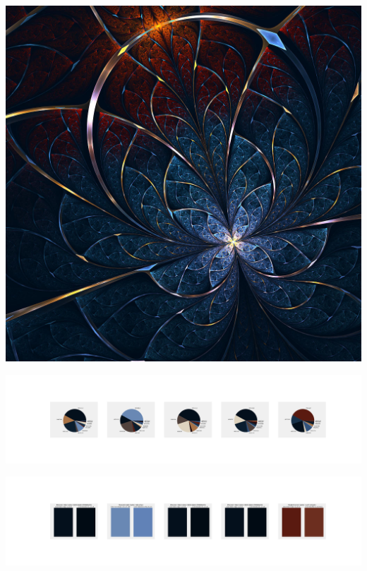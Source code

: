 \documentclass[11pt]{article}
\begin{document}
\begin{landscape}
    \begin{center}
    \includegraphics[width=\textwidth]{./nbimg/file (210).jpg}
    \end{center}

    \begin{center}
    \includegraphics[width=250mm]{./nbimg/pie-124.jpg}
    \end{center}

    \begin{center}
    \includegraphics[width=250mm]{./nbimg/peak-124.jpg}
    \end{center}
    


\end{landscape}
\end{document}
